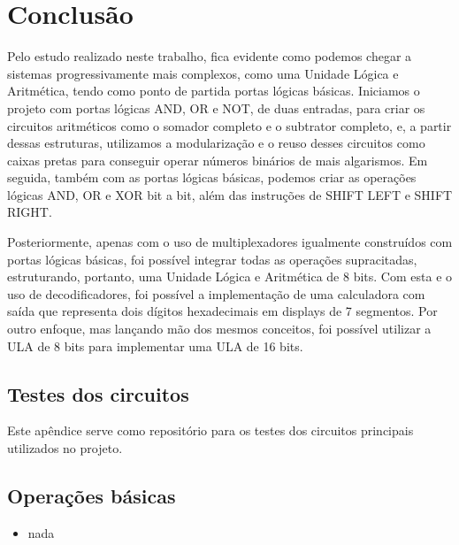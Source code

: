 \documentclass[
	12pt,				%
	openright,			%
	twoside,			%
	a4paper,			%
	english,			%
	french,				%
	spanish,			%
	brazil,				%
	]{abntex2}
\begin{document}
\chapter*[Conclusão]{Conclusão}

Pelo estudo realizado neste trabalho, fica evidente como podemos chegar a sistemas progressivamente mais complexos, como uma Unidade Lógica e Aritmética, tendo como ponto de partida portas lógicas básicas. Iniciamos o projeto com portas lógicas AND, OR e NOT, de duas entradas, para criar os circuitos aritméticos como o somador completo e o subtrator completo, e, a partir dessas estruturas, utilizamos a modularização e o reuso desses circuitos como caixas pretas para conseguir operar números binários de mais algarismos. Em seguida, também com as portas lógicas básicas, podemos criar as operações lógicas AND, OR e XOR bit a bit, além das instruções de SHIFT LEFT e SHIFT RIGHT.

Posteriormente, apenas com o uso de multiplexadores igualmente construídos com portas lógicas básicas, foi possível integrar todas as operações supracitadas, estruturando, portanto, uma Unidade Lógica e Aritmética de 8 bits. Com esta e o uso de decodificadores, foi possível a implementação de uma calculadora com saída que representa dois dígitos hexadecimais em displays de 7 segmentos. Por outro enfoque, mas lançando mão dos mesmos conceitos, foi possível utilizar a ULA de 8 bits para implementar uma ULA de 16 bits.

\begin{apendicesenv}

\chapter{Testes dos circuitos}\label{apendiceA}

Este apêndice serve como repositório para os testes dos circuitos principais utilizados no projeto.

\section{Operações básicas}
\begin{itemize}

\item nada

\end{itemize}

\end{apendicesenv}
\end{document}
